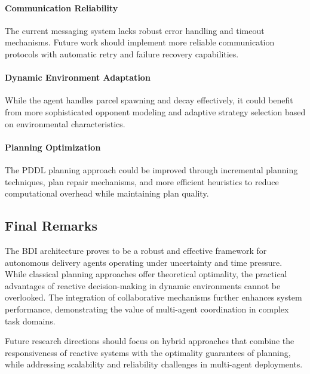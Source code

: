 \paragraph{Communication Reliability}
The current messaging system lacks robust error handling and timeout mechanisms. Future work should implement more reliable communication protocols with automatic retry and failure recovery capabilities.

\paragraph{Dynamic Environment Adaptation}
While the agent handles parcel spawning and decay effectively, it could benefit from more sophisticated opponent modeling and adaptive strategy selection based on environmental characteristics.

\paragraph{Planning Optimization}
The PDDL planning approach could be improved through incremental planning techniques, plan repair mechanisms, and more efficient heuristics to reduce computational overhead while maintaining plan quality.

\subsection{Final Remarks}

The BDI architecture proves to be a robust and effective framework for autonomous delivery agents operating under uncertainty and time pressure. While classical planning approaches offer theoretical optimality, the practical advantages of reactive decision-making in dynamic environments cannot be overlooked. The integration of collaborative mechanisms further enhances system performance, demonstrating the value of multi-agent coordination in complex task domains.

Future research directions should focus on hybrid approaches that combine the responsiveness of reactive systems with the optimality guarantees of planning, while addressing scalability and reliability challenges in multi-agent deployments.
